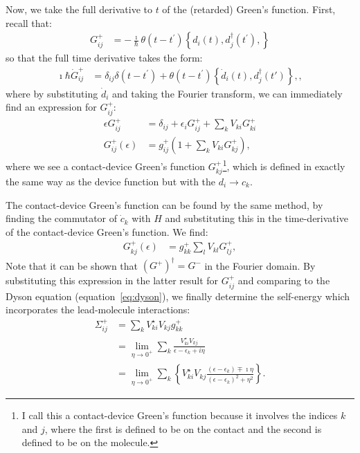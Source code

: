 Now, we take the full derivative to $t$ of the (retarded) Green's function. First, recall that:
\begin{align*}
G_{ij}^+ &= - \frac{\imath}{\hbar} \theta(t-t^\prime) \left\{ d_i(t), d_j^\dagger(t^\prime), \right\}
\end{align*}
so that the full time derivative takes the form:
\begin{align}
\imath\hbar \dot{G}_{ij}^+ &= \delta_{ij} \delta(t - t^\prime) + \theta(t-t^\prime) \left\{ \dot{d}_i (t), d_j^\dagger (t')\right\},
\label{eq:eomgf},
\end{align} where by substituting $\dot{d}_i$ and taking the Fourier transform, we can immediately find an expression for $G_{ij}^+$:
\begin{align*} 
\epsilon G_{ij}^+ &= \delta_{ij} + \epsilon_i G^+_{ij}+ \sum_k V_{ki} G^+_{ki}\\
G_{ij}^+ (\epsilon) &= g_{ij}^+ \left( 1 + \sum_{k} V_{ki} G_{kj}^+ \right),
\end{align*} where we see a contact-device Green's function $G_{kj}^+$\footnote{I call this a contact-device Green's function because it involves the indices $k$ and $j$, where the first is defined to be on the contact and the second is defined to be on the molecule.}, which is defined in exactly the same way as the device function but with the $d_i \rightarrow c_{k}$.

The contact-device Green's function can be found by the same method, by finding the commutator of $\dot{c}_{k}$ with $H$ and substituting this in the time-derivative of the contact-device Green's function. We find:
\begin{align}
G_{kj}^+ (\epsilon) &= g_{kk}^+ \sum_l V_{kl} G_{lj}^+,\label{eq:contactdevice}
\end{align} Note that it can be shown that $(G^+)^\dagger=G^-$ in the Fourier domain.
By substituting this expression in the latter result for $G_{ij}^+$ and comparing to the Dyson equation (equation~\ref{eq:dyson}), we finally determine the self-energy which incorporates the lead-molecule interactions:
\begin{align*}
\Sigma_{ij}^+ &= \sum_{k} V_{ki}^\star V_{kj} g_{kk}^+ \\
&= \lim_{\eta\rightarrow 0^+} \sum_{k}\frac{ V_{ki}^\star V_{kj}}{\epsilon-\epsilon_{k} + i\eta} \\
&= \lim_{\eta\rightarrow 0^+}\sum_{k} \left\{V_{ki}^\star V_{kj} \frac{ \left(\epsilon-\epsilon_{k}\right) \mp \imath \eta}{  \left(\epsilon-\epsilon_{k}\right)^2 + \eta^2}\right\}.
\end{align*} 


